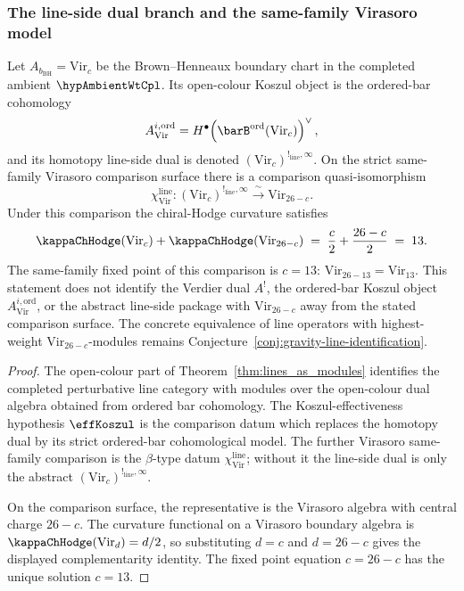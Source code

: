 \subsubsection*{The line-side dual branch and the same-family Virasoro model}

\begin{proposition}
\label{prop:gravity-koszul-dual}
Let \(A_{b_{\mathrm{BH}}}=\mathrm{Vir}_c\) be the
Brown--Henneaux boundary chart in the completed ambient
\(\hypAmbientWtCpl\).  Its open-colour Koszul object is the ordered-bar
cohomology
\[
A^{i,\mathrm{ord}}_{\mathrm{Vir}}
  = H^\bullet\!\left(\barB^{\mathrm{ord}}(\mathrm{Vir}_c)\right)^\vee,
\]
and its homotopy line-side dual is denoted
\((\mathrm{Vir}_c)^{!_{\mathrm{line}},\infty}\).  On the strict
same-family Virasoro comparison surface there is a comparison
quasi-isomorphism
\[
\chi_{\mathrm{Vir}}^{\mathrm{line}}\colon
(\mathrm{Vir}_c)^{!_{\mathrm{line}},\infty}
\xrightarrow{\ \sim\ }
\mathrm{Vir}_{26-c}.
\]
Under this comparison the chiral-Hodge curvature satisfies
\[
\kappaChHodge(\mathrm{Vir}_c) + \kappaChHodge(\mathrm{Vir}_{26-c})
\;=\;
\frac{c}{2} + \frac{26-c}{2}
\;=\; 13.
\]
The same-family fixed point of this comparison is \(c=13\):
$\mathrm{Vir}_{26-13}=\mathrm{Vir}_{13}$.
This statement does not identify the Verdier dual \(A^!\), the
ordered-bar Koszul object \(A^{i,\mathrm{ord}}_{\mathrm{Vir}}\), or
the abstract line-side package with \(\mathrm{Vir}_{26-c}\) away from
the stated comparison surface.  The concrete equivalence of line
operators with highest-weight \(\mathrm{Vir}_{26-c}\)-modules remains
Conjecture~\textup{\ref{conj:gravity-line-identification}}.
\end{proposition}

\begin{proof}
The open-colour part of Theorem~\ref{thm:lines_as_modules} identifies
the completed perturbative line category with modules over the
open-colour dual algebra obtained from ordered bar cohomology.  The
Koszul-effectiveness hypothesis \(\effKoszul\) is the comparison datum
which replaces the homotopy dual by its strict ordered-bar
cohomological model.  The further Virasoro same-family comparison is
the \(\beta\)-type datum \(\chi_{\mathrm{Vir}}^{\mathrm{line}}\);
without it the line-side dual is only the abstract
\((\mathrm{Vir}_c)^{!_{\mathrm{line}},\infty}\).

On the comparison surface, the representative is the Virasoro algebra
with central charge \(26-c\).  The curvature functional on a Virasoro
boundary algebra is
\(\kappaChHodge(\mathrm{Vir}_d)=d/2\), so substituting \(d=c\) and
\(d=26-c\) gives the displayed complementarity identity.  The fixed
point equation \(c=26-c\) has the unique solution \(c=13\).
\end{proof}


